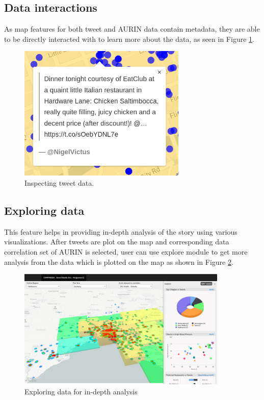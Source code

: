 \subsection{Data interactions}

As map features for both tweet and AURIN data contain metadata, they are able to be directly interacted with to learn more about the data, as seen in Figure \ref{fig:visinteract}.

\begin{figure}[H]
    \centering
    \includegraphics[width=8cm,keepaspectratio=true]{images/interact.png}
    \caption{Inspecting tweet data.}
    \label{fig:visinteract}
\end{figure}

\subsection{Exploring data} \label{explore}
This feature helps in providing in-depth analysis of the story using various visualizations. After tweets are plot on the map and corresponding data correlation set of AURIN is selected, user can use explore module to get more analysis from the data which is plotted on the map as shown in Figure \ref{fig:exploreui}.

\begin{figure}[H]
    \centering
    \includegraphics[width=10cm,keepaspectratio=true]{images/explore_UI.png}
    \caption{Exploring data for in-depth analysis}
    \label{fig:exploreui}
\end{figure}


